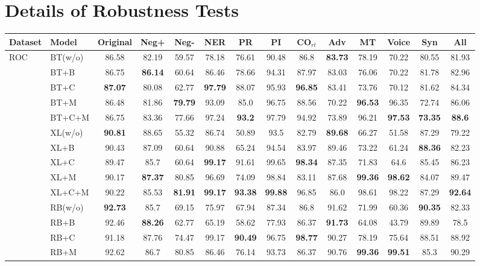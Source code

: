 \documentclass{ecai}  %
\begin{document}
\appendix
\section{Details of Robustness Tests}
\begin{table*}[th]
\scriptsize
\centering
\begin{tabular}{ll|c|ccccccccccc}\hline
\toprule  
\textbf{Dataset}&\textbf{Model}&\textbf{Original} &\textbf{Neg+} & \textbf{Neg-} &\textbf{NER} &\textbf{PR} &\textbf{PI} 
                                               &\textbf{CO$_{rt}$}&\textbf{Adv}&\textbf{MT}&\textbf{Voice}&\textbf{Syn}&\textbf{All}
                                               \\ 
 \midrule
 \multirow{15}{*}{ROC} 
 		    
                &  BT(w/o) &86.58&82.19&59.57&78.18&76.61&90.48&86.8&\bf{83.73}&78.19&70.22&80.55&81.93
                						\\ 
		&  BT+B & 86.75&\bf{86.14}&60.64&86.46&78.66&94.31&87.97&83.03&76.06&70.22&81.78&82.96
 						        \\ 
		&  BT+C & \bf{87.07}&80.08&62.77&\bf{97.79}&88.07&95.93&\bf{96.85}&83.41&73.76&70.12&81.62&84.34
 						        \\ 
		   & BT+M & 86.48&81.86&\bf{79.79}&93.09&85.0&96.75&88.56&70.22&\bf{96.53}&96.35&72.74&86.06
 						       \\ 
		   & BT+C+M& 86.75&83.36&77.66&97.24&\bf{93.2}&97.79&94.92&73.89&96.21&\bf{97.53}&\bf{73.35}&\bf{88.6}
		
 					     	       \\ \cmidrule{2-14}
						          
		&  XL(w/o) & \bf{90.81}&88.65&55.32&86.74&50.89&93.5&82.79&\bf{89.68}&66.27&51.58&87.29&79.22
                						\\ 
		&  XL+B & 90.43&87.09&60.64&90.88&65.24&94.54&83.97&89.46&73.22&61.24&\bf{88.36}&82.23
 						        \\ 
		&  XL+C & 89.47&85.7&60.64&\bf{99.17}&91.61&99.65&\bf{98.34}&87.35&71.83&64.6&85.45&86.23
 						        \\ 
		   & XL+M & 90.17&\bf{87.37}&80.85&96.69&74.09&98.84&83.11&87.68&\bf{99.36}&\bf{98.62}&84.07&89.47

 						       \\ 
		   & XL+C+M& 90.22&85.53&\bf{81.91}&\bf{99.17}&\bf{93.38}&\bf{99.88}&96.85&86.0&98.61&98.22&87.29&\bf{92.64}
 					     	       \\ \cmidrule{2-14}
	&  RB(w/o) & \bf{92.73} &85.7&69.15&75.97&67.94&87.34&86.8&91.62&71.99&60.36&\bf{90.35}&82.33
                						\\ 
		&  RB+B & 92.46&\bf{88.26}&62.77&65.19&58.62&77.93&86.37&\bf{91.73}&64.08&43.79&89.89&78.5
 						        \\ 
		&  RB+C & 91.18 &87.76&74.47&99.17&\bf{90.49}&96.75&\bf{98.77}&90.27&78.19&75.64&88.51&88.92
 						        \\ 
		   & RB+M &92.62 &86.7&80.85&86.46&76.14&93.73&86.37&90.76&\bf{99.36}&\bf{99.51}&85.3&90.29


\end{tabular}
\end{table*}
\end{document}
